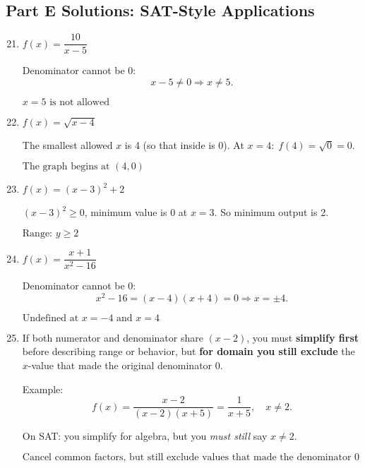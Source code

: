 \documentclass[12pt]{article}
\begin{document}
\subsection*{Part E Solutions: SAT-Style Applications}
\begin{enumerate}
  \setcounter{enumi}{20}
  \item \(f(x) = \dfrac{10}{x - 5}\)

  Denominator cannot be 0:
  \[
  x - 5 \ne 0 \Rightarrow x \ne 5.
  \]

  \(\boxed{x = 5 \text{ is not allowed}}\)

  \item \(f(x) = \sqrt{x - 4}\)

  The smallest allowed \(x\) is 4 (so that inside is 0).  
  At \(x = 4:\; f(4) = \sqrt{0} = 0.\)

  \(\boxed{\text{The graph begins at } (4,0)}\)

  \item \(f(x) = (x - 3)^2 + 2\)

  \((x - 3)^2 \ge 0\), minimum value is 0 at \(x = 3\).  
  So minimum output is 2.

  \(\boxed{\text{Range: } y \ge 2}\)

  \item \(f(x) = \dfrac{x + 1}{x^2 - 16}\)

  Denominator cannot be 0:
  \[
  x^2 - 16 = (x - 4)(x + 4) = 0
  \Rightarrow x = \pm 4.
  \]

  \(\boxed{\text{Undefined at } x = -4 \text{ and } x = 4}\)

  \item If both numerator and denominator share \((x - 2)\), you must \textbf{simplify first} before describing range or behavior, but \textbf{for domain you still exclude} the \(x\)-value that made the original denominator 0.

  Example:
  \[
  f(x) = \frac{x - 2}{(x - 2)(x + 5)} = \frac{1}{x + 5}, \quad x \ne 2.
  \]

  On SAT: you simplify for algebra, but you \emph{must still} say \(x \ne 2\).

  \(\boxed{\text{Cancel common factors, but still exclude values that made the denominator 0 originally}}\)
\end{enumerate}
\end{document}
